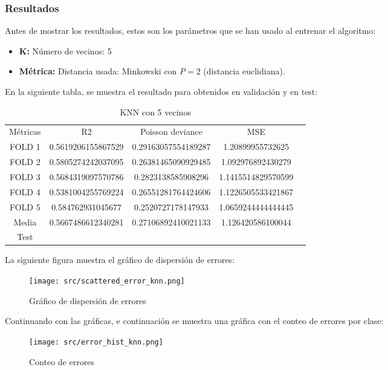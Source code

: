 \subsubsection{Resultados}
Antes de mostrar los resultados, estos son los parámetros que se han usado al entrenar el algoritmo:
\begin{itemize}
	\item \textbf{K:} Número de vecinos: 5
	\item \textbf{Métrica:} Distancia usada: Minkowski con $P=2$ (distancia euclidiana).
\end{itemize}
En la siguiente tabla, se muestra el resultado para obtenidos en validación y en test:\\
\linebreak
\begin{table}[!htbp]
	\begin{tabular}{|c|c|c|c|c}
		\cline{1-4}
		Métricas & R2                 & Poisson deviance     & MSE                 \\ \cline{1-4}
		FOLD 1   & 0.5619206155867529 & 0.29163057554189287  & 1.20899955732625    \\ \cline{1-4}
		FOLD 2   & 0.5805274242037095 & 0.26381465090929485  & 1.092976892430279   \\ \cline{1-4}
		FOLD 3   & 0.5684319097570786 & 0.2823138585908296   & 1.1415514829570599  \\ \cline{1-4}
		FOLD 4   & 0.5381004255769224 &  0.26551281764424606 & 1.1226505533421867  \\ \cline{1-4}
		FOLD 5   & 0.584762931045677  & 0.2520727178147933   & 1.0659244444444445  \\ \cline{1-4}
		Media    & 0.5667486612340281 & 0.27106892410021133  & 1.126420586100044   \\ \cline{1-4}
		Test & & & \\ \cline{1-4}
	\end{tabular}
	\caption{KNN con 5 vecinos}
	\label{tab:knn_res}
\end{table}
La siguiente figura muestra el gráfico de dispersión de errores:
\begin{figure}[!htbp]
	\centering
	\texttt{[image: src/scattered\_error\_knn.png]}
	\caption{Gráfico de dispersión de errores}
	\label{fig:knn_scattered}
\end{figure}
Continuando con las gráficas, e continuación se muestra una gráfica con el conteo de errores por clase:
\begin{figure}[!htbp]
	\centering
	\texttt{[image: src/error\_hist\_knn.png]}
	\caption{Conteo de errores}
	\label{fig:knn_error_plot}
\end{figure}

